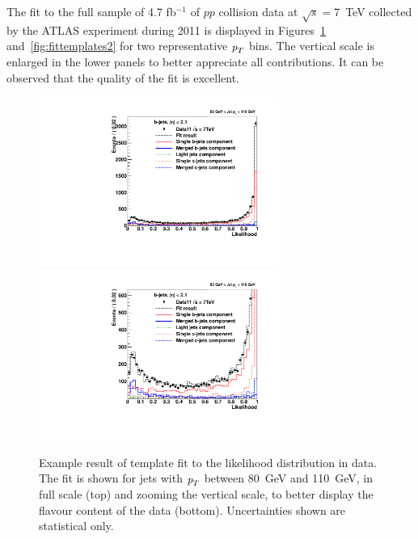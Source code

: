 The fit to the full sample of 4.7 fb$^{-1}$ of $pp$ collision data at $\sqrt{s}=7$~TeV collected by the ATLAS experiment during 2011 is displayed in Figures~\ref{fig:fittemplates1} and~\ref{fig:fittemplates2} for two representative ${\emph{p}_{T}}$ bins. The vertical scale is enlarged in the lower panels to better appreciate all contributions. It can be observed that the quality of the fit is excellent.
\begin{figure}[tp]
\centering
\includegraphics[width=0.7\textwidth]{FIGS/Fits/LikelihoodFit_3param_ETAFull_Bin2.pdf}
\includegraphics[width=0.7\textwidth]{FIGS/Fits/LikelihoodFit_3param_ETAFull_ZOOM_Bin2.pdf}
\caption{Example result of template fit to the likelihood distribution in data. The fit is shown for jets with ${\emph{p}_{T}}$ between  80~GeV and 110~GeV, in full scale (top) and zooming the vertical scale, to better display the flavour content of the data (bottom). Uncertainties shown are statistical only.}
\label{fig:fittemplates1}
\end{figure}
